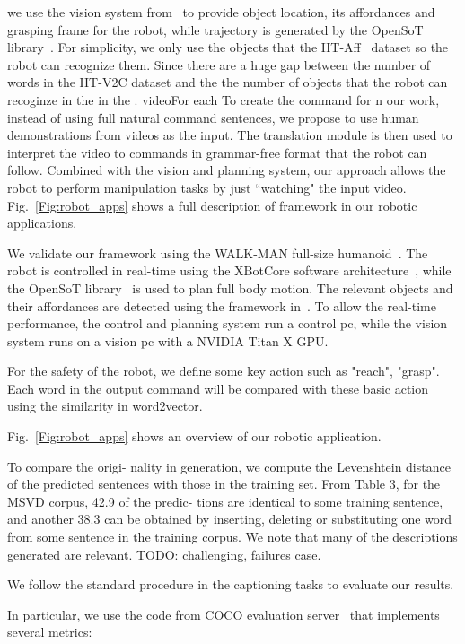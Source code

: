 { we use the vision system from~\cite{Nguyen2017_Aff} to provide object location, its affordances and grasping frame for the robot, while trajectory is generated by the OpenSoT library~\cite{Rocchi15}. For simplicity, we only use the objects that the IIT-Aff~\cite{Nguyen2017_Aff} dataset so the robot can recognize them. Since there are a huge gap between the number of words in the IIT-V2C dataset  and the the number of objects that the robot can recoginze in the  in the  . videoFor each To create the command for  n our work, instead of using full natural command sentences, we propose to use human demonstrations from videos as the input. The translation module is then used to interpret the video to commands in grammar-free format that the robot can follow. Combined with the vision and planning system, our approach allows the robot to perform manipulation tasks by just ``watching" the input video. Fig.~\ref{Fig:robot_apps} shows a full description of framework in our robotic applications. 


We validate our framework using the WALK-MAN full-size humanoid~\cite{Niko2016_full}. The robot is controlled in real-time using the XBotCore software architecture~\cite{muratore2017xbotcore}, while the OpenSoT library~\cite{Rocchi15} is used to plan full body motion. The relevant objects and their affordances are detected using the framework in~\cite{Nguyen2017_Aff}. To allow the real-time performance, the control and planning system run a control pc, while the vision system runs on a vision pc with a NVIDIA Titan X GPU.


For the safety of the robot, we define some key action such as "reach", "grasp". Each word in the output command will be compared with these basic action using the similarity in word2vector. 

Fig.~\ref{Fig:robot_apps} shows an overview of our robotic application.


To compare the origi- nality in generation, we compute the Levenshtein distance of the predicted sentences with those in the training set. From Table 3, for the MSVD corpus, 42.9 of the predic- tions are identical to some training sentence, and another 38.3 can be obtained by inserting, deleting or substituting one word from some sentence in the training corpus. We note that many of the descriptions generated are relevant. TODO: challenging, failures case.


 We follow the standard procedure in the captioning tasks to evaluate our results.
 
 
 In particular, we use the code from COCO evaluation server~\cite{Chen_COCO_Evaluation} that implements several metrics:

}
